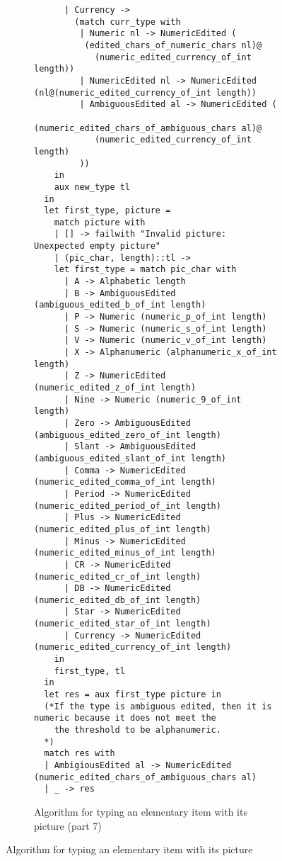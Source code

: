 \documentclass[a4paper,10pt]{article}
\begin{document}
\begin{figure}[!ht]
  \ContinuedFloat
  \begin{subfigure}{1.05\textwidth}
    \begin{verbatim}
      | Currency ->
        (match curr_type with
         | Numeric nl -> NumericEdited (
          (edited_chars_of_numeric_chars nl)@
            (numeric_edited_currency_of_int length))
         | NumericEdited nl -> NumericEdited (nl@(numeric_edited_currency_of_int length))
         | AmbiguousEdited al -> NumericEdited (
          (numeric_edited_chars_of_ambiguous_chars al)@
            (numeric_edited_currency_of_int length)
         ))
    in
    aux new_type tl
  in
  let first_type, picture =
    match picture with
    | [] -> failwith "Invalid picture: Unexpected empty picture"
    | (pic_char, length)::tl ->
    let first_type = match pic_char with
      | A -> Alphabetic length
      | B -> AmbiguousEdited (ambiguous_edited_b_of_int length)
      | P -> Numeric (numeric_p_of_int length)
      | S -> Numeric (numeric_s_of_int length)
      | V -> Numeric (numeric_v_of_int length)
      | X -> Alphanumeric (alphanumeric_x_of_int length)
      | Z -> NumericEdited (numeric_edited_z_of_int length)
      | Nine -> Numeric (numeric_9_of_int length)
      | Zero -> AmbiguousEdited (ambiguous_edited_zero_of_int length)
      | Slant -> AmbiguousEdited (ambiguous_edited_slant_of_int length)
      | Comma -> NumericEdited (numeric_edited_comma_of_int length)
      | Period -> NumericEdited (numeric_edited_period_of_int length)
      | Plus -> NumericEdited (numeric_edited_plus_of_int length)
      | Minus -> NumericEdited (numeric_edited_minus_of_int length)
      | CR -> NumericEdited (numeric_edited_cr_of_int length)
      | DB -> NumericEdited (numeric_edited_db_of_int length)
      | Star -> NumericEdited (numeric_edited_star_of_int length)
      | Currency -> NumericEdited (numeric_edited_currency_of_int length)
    in
    first_type, tl
  in
  let res = aux first_type picture in
  (*If the type is ambiguous edited, then it is numeric because it does not meet the
    the threshold to be alphanumeric.
  *)
  match res with
  | AmbigiousEdited al -> NumericEdited (numeric_edited_chars_of_ambiguous_chars al)
  | _ -> res
    \end{verbatim}
    \caption{Algorithm for typing an elementary item with its picture (part 7)}
    \label{fig:algo_typ_elem_pic_7}
  \end{subfigure}
  \caption{Algorithm for typing an elementary item with its picture}
  \label{fig:algo_typ_elem_pic}
\end{figure}
\end{document}
